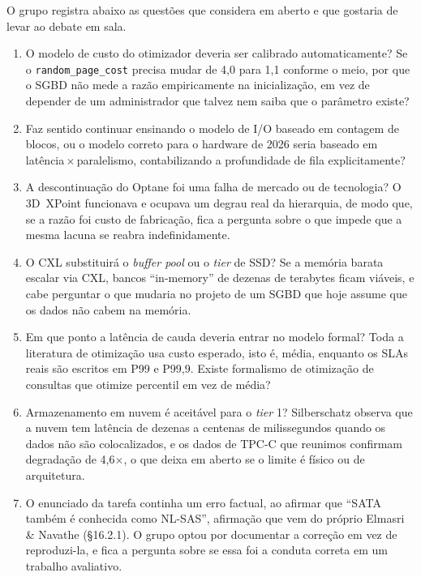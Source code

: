 \documentclass[11pt,a4paper]{article}
\begin{document}
O grupo registra abaixo as questões que considera em aberto e que gostaria de levar ao debate em
sala.

\begin{enumerate}[label=\textbf{Q\arabic*.}]
\item O modelo de custo do otimizador deveria ser calibrado automaticamente? Se o
      \texttt{random\_page\_cost} precisa mudar de 4,0 para 1,1 conforme o meio, por que o
      SGBD não mede a razão empiricamente na inicialização, em vez de depender de um
      administrador que talvez nem saiba que o parâmetro existe?
\item Faz sentido continuar ensinando o modelo de I/O baseado em contagem de blocos, ou o
      modelo correto para o hardware de 2026 seria baseado em latência\,$\times$\,paralelismo,
      contabilizando a profundidade de fila explicitamente?
\item A descontinuação do Optane foi uma falha de mercado ou de tecnologia? O 3D~XPoint
      funcionava e ocupava um degrau real da hierarquia, de modo que, se a razão foi custo de
      fabricação, fica a pergunta sobre o que impede que a mesma lacuna se reabra indefinidamente.
\item O CXL substituirá o \emph{buffer pool} ou o \emph{tier} de SSD? Se a memória barata
      escalar via CXL, bancos ``in-memory'' de dezenas de terabytes ficam viáveis, e cabe perguntar
      o que mudaria no projeto de um SGBD que hoje assume que os dados não cabem na memória.
\item Em que ponto a latência de cauda deveria entrar no modelo formal? Toda a literatura de
      otimização usa custo esperado, isto é, média, enquanto os SLAs reais são escritos em P99 e
      P99,9. Existe formalismo de otimização de consultas que otimize percentil em vez de média?
\item Armazenamento em nuvem é aceitável para o \emph{tier} 1? Silberschatz observa que a
      nuvem tem latência de dezenas a centenas de milissegundos quando os dados não são
      colocalizados, e os dados de TPC-C que reunimos confirmam degradação de 4,6$\times$, o que
      deixa em aberto se o limite é físico ou de arquitetura.
\item O enunciado da tarefa continha um erro factual, ao afirmar que ``SATA também é conhecida
      como NL-SAS'', afirmação que vem do próprio Elmasri \& Navathe (§16.2.1). O grupo optou por
      documentar a correção em vez de reproduzi-la, e fica a pergunta sobre se essa foi a conduta
      correta em um trabalho avaliativo.
\end{enumerate}
\end{document}
